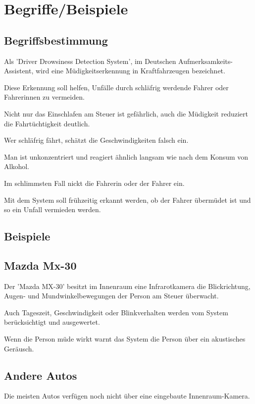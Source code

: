 \section{Begriffe/Beispiele}

\subsection{Begriffsbestimmung}

Als 'Driver Drowsiness Detection System', im Deutschen Aufmerksamkeits-Assistent, wird eine Müdigkeitserkennung in Kraftfahrzeugen bezeichnet.

Diese Erkennung soll helfen, Unfälle durch schläfrig werdende Fahrer oder Fahrerinnen zu vermeiden. 

Nicht nur das Einschlafen am Steuer ist gefährlich, auch die Müdigkeit reduziert die Fahrtüchtigkeit deutlich. 

Wer schläfrig fährt, schätzt die Geschwindigkeiten falsch ein. 

Man ist unkonzentriert und reagiert ähnlich langsam wie nach dem Konsum von Alkohol.

Im schlimmsten Fall nickt die Fahrerin oder der Fahrer ein. 

Mit dem System soll frühzeitig erkannt werden, ob der Fahrer übermüdet ist und so ein Unfall vermieden werden.\cite{b7}

\subsection{Beispiele}

\subsection{Mazda Mx-30}
Der 'Mazda MX-30' besitzt im Innenraum eine 
Infrarotkamera die Blickrichtung, Augen- und Mundwinkelbewegungen der Person am Steuer überwacht. 

Auch Tageszeit, Geschwindigkeit oder Blinkverhalten werden vom System berücksichtigt und ausgewertet.

Wenn die Person müde wirkt warnt das System die Person über ein akustisches Geräusch.\cite{b2}


\subsection{Andere Autos}
Die meisten Autos verfügen noch nicht über eine eingebaute Innenraum-Kamera.

